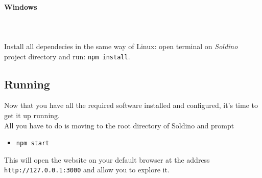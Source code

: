 \paragraph{Windows} \mbox{} \\ \mbox{} \\
Install all dependecies in the same way of Linux: open terminal on \textit{Soldino} project directory and run: \texttt{npm install}.

\subsection{Running}
Now that you have all the required software installed and configured, it's time to get it up running.\\
All you have to do is moving to the root directory of Soldino and prompt
\begin{itemize}
	\item[]\texttt{npm start}
\end{itemize}
This will open the website on your default browser at the address \texttt{http://127.0.0.1:3000} and allow you to explore it. 


%
% 
